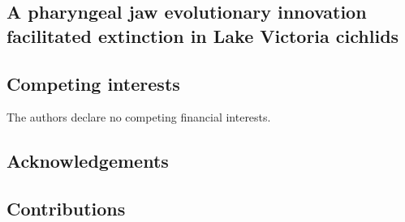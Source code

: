 \begin{refsection}

\chapter{A pharyngeal jaw evolutionary innovation facilitated extinction in Lake Victoria cichlids}





\section{Competing interests}

The authors declare no competing financial interests.

\section{Acknowledgements}

\section{Contributions}

\printbibliography[heading=subbibliography]

\end{refsection}